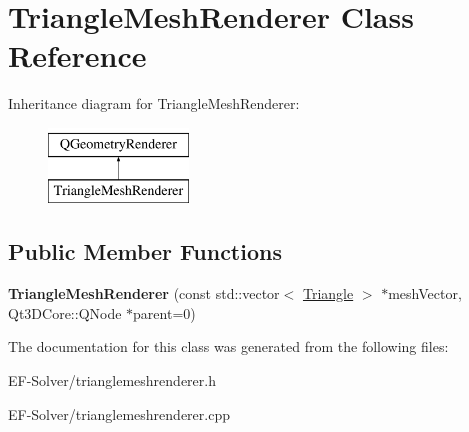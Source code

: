 \hypertarget{class_triangle_mesh_renderer}{}\section{Triangle\+Mesh\+Renderer Class Reference}
\label{class_triangle_mesh_renderer}
Inheritance diagram for Triangle\+Mesh\+Renderer\+:\begin{figure}[H]
\begin{center}
\leavevmode
\includegraphics[height=2.000000cm]{class_triangle_mesh_renderer}
\end{center}
\end{figure}
\subsection*{Public Member Functions}
\begin{DoxyCompactItemize}
\item 
{\bfseries Triangle\+Mesh\+Renderer} (const std\+::vector$<$ \hyperlink{struct_triangle}{Triangle} $>$ $\ast$mesh\+Vector, Qt3\+D\+Core\+::\+Q\+Node $\ast$parent=0)\hypertarget{class_triangle_mesh_renderer_a1eb6d6afbd80596e0cc05a3b92dcb351}{}\label{class_triangle_mesh_renderer_a1eb6d6afbd80596e0cc05a3b92dcb351}

\end{DoxyCompactItemize}


The documentation for this class was generated from the following files\+:\begin{DoxyCompactItemize}
\item 
E\+F-\/\+Solver/trianglemeshrenderer.\+h\item 
E\+F-\/\+Solver/trianglemeshrenderer.\+cpp\end{DoxyCompactItemize}
